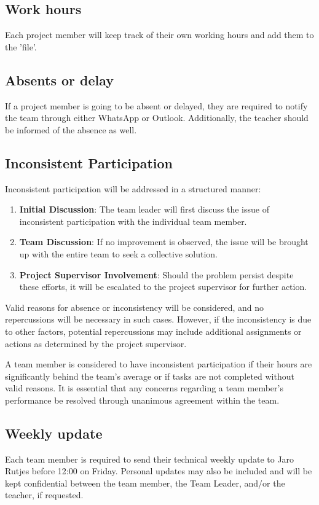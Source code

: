 \documentclass{projdoc}
\begin{document}
\subsection{Work hours}
Each project member will keep track of their own working hours and 
add them to the 'file'.

\subsection{Absents or delay}
If a project member is going to be absent or delayed, they are required to notify the 
team through either WhatsApp or Outlook. Additionally, the teacher should 
be informed of the absence as well.

\subsection{Inconsistent Participation}
Inconsistent participation will be addressed in a structured manner:

\begin{enumerate}
    \item \textbf{Initial Discussion}: The team leader will first discuss the 
    issue of inconsistent participation with the individual team member.
    \item \textbf{Team Discussion}: If no improvement is observed, the issue 
    will be brought up with the entire team to seek a collective solution.
    \item \textbf{Project Supervisor Involvement}: Should the problem persist 
    despite these efforts, it will be escalated to the project supervisor for 
    further action.
\end{enumerate}

Valid reasons for absence or inconsistency will be considered, and no 
repercussions will be necessary in such cases. However, if the inconsistency 
is due to other factors, potential repercussions may include additional 
assignments or actions as determined by the project supervisor.

A team member is considered to have inconsistent participation if their hours 
are significantly behind the team’s average or if tasks are not completed 
without valid reasons. It is essential that any concerns regarding a team 
member's performance be resolved through unanimous agreement within the team.


\subsection{Weekly update}
Each team member is required to send their technical weekly update to Jaro 
Rutjes before 12:00 on Friday. Personal updates may also be included and will be kept 
confidential between the team member, the Team Leader, and/or the teacher, 
if requested.
\end{document}
